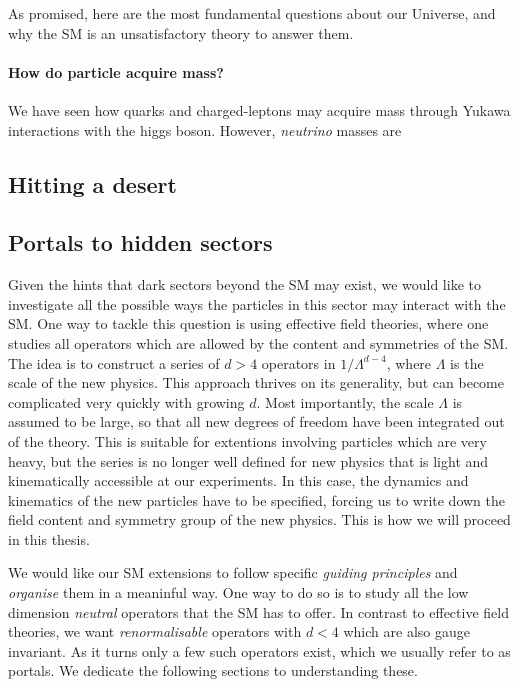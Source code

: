 As promised, here are the most fundamental questions about our Universe, and why the SM is an unsatisfactory theory to answer them.

\paragraph{How do particle acquire mass?} We have seen how quarks and charged-leptons may acquire mass through Yukawa interactions with the higgs boson. However, \emph{neutrino} masses are 


\subsection{Hitting a desert}

\subsection{Portals to hidden sectors}

Given the hints that dark sectors beyond the SM may exist, we would like to investigate all the possible ways the particles in this sector may interact with the SM. One way to tackle this question is using effective field theories, where one studies all operators which are allowed by the content and symmetries of the SM. The idea is to construct a series of $d>4$ operators in $1/\Lambda^{d-4}$, where $\Lambda$ is the scale of the new physics. This approach thrives on its generality, but can become complicated very quickly with growing $d$. Most importantly, the scale $\Lambda$ is assumed to be large, so that all new degrees of freedom have been integrated out of the theory. This is suitable for extentions involving particles which are very heavy, but the series is no longer well defined for new physics that is light and kinematically accessible at our experiments. In this case, the dynamics and kinematics of the new particles have to be specified, forcing us to write down the field content and symmetry group of the new physics. This is how we will proceed in this thesis.

We would like our SM extensions to follow specific \emph{guiding principles} and \emph{organise} them in a meaninful way. One way to do so is to study all the low dimension \emph{neutral} operators that the SM has to offer. In contrast to effective field theories, we want \emph{renormalisable} operators with $d<4$ which are also gauge invariant. As it turns only a few such operators exist, which we usually refer to as portals. We dedicate the following sections to understanding these.

